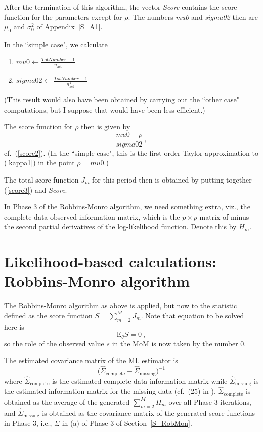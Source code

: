 \documentclass[a4paper,12pt,fleqn]{article}
\newcommand{\E}{\mbox{E}}
\begin{document}
After the termination of this algorithm, the vector \textit{Score}
contains the score function for the parameters except for $\rho$.
The numbers \textit{mu0} and \textit{sigma02}
then are $\mu_0$ and $\sigma^2_0$ of Appendix~\ref{S_A1}.

In the ``simple case", we calculate
\begin{enumerate}
\item[\ref{i_mu0}.] $\textit{mu0}  \leftarrow
         \frac{\displaystyle \textit{TotNumber} - 1 }{\displaystyle  n_\text{act}}$
\item[\ref{i_sig}.] $\textit{sigma02}  \leftarrow
          \frac{\displaystyle \textit{TotNumber} - 1 }{\displaystyle n_\text{act}^2}$
\end{enumerate}
(This result would also have been obtained by carrying out the ``other case" computations,
but I suppose that would have been less efficient.)

The score function for $\rho$ then is given by
\begin{equation}
           \frac{ \textit{mu0} - \rho}{\textit{sigma02}} \ , \label{score3}
\end{equation}
cf.\ (\ref{score2}).
(In the ``simple case", this is the first-order Taylor approximation to (\ref{kappa1})
in the point $\rho = \textit{mu0}$.)

The total score function $J_m$ for this period then is obtained by putting
together (\ref{score3}) and \textit{Score}.
\fi

In Phase 3 of the Robbins-Monro algorithm, we need something extra, viz.,
the complete-data observed information matrix, which is the
$p \times p$ matrix of minus the second partial derivatives
of the log-likelihood function.
Denote this by $H_m$.


\section{Likelihood-based calculations:
         \protect\newline Robbins-Monro algorithm}
\label{S_MLRM}

The Robbins-Monro algorithm as above is applied, but now to the statistic
defined as the score function $S = \sum_{m=2}^M J_m$.
Note that equation to be solved here is
\[
 \E_{\theta} S = 0 \ ,
\]
so the role of the observed value $s$  in the MoM is now taken by the number 0.

The estimated covariance matrix of the ML estimator is
\[
\Big(\hat\Sigma_\text{complete} - \hat\Sigma_\text{missing} \Big)^{-1}
\]
where $\hat\Sigma_\text{complete}$ is the estimated complete data information
matrix while $\hat\Sigma_\text{missing} $ is the estimated information
matrix for the missing data (cf.\ (25) in \citet{SnijdersEA10a}).
$\hat\Sigma_\text{complete}$ is obtained as the average of the generated
$\sum_{m=2}^M H_m$ over all Phase-3 iterations,
and $\hat\Sigma_\text{missing} $ is obtained as the covariance matrix
of the generated score functions in Phase 3, i.e., $\Sigma$ in (a)
of Phase 3 of Section~\ref{S_RobMon}.
\end{document}
